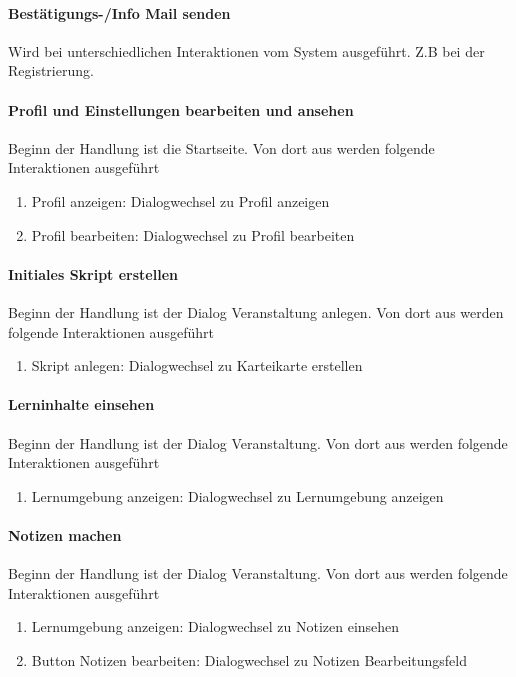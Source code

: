 \documentclass[12pt,a4paper]{article}
\begin{document}
{\paragraph{Bestätigungs-/Info Mail senden}
Wird bei unterschiedlichen Interaktionen vom System ausgeführt. Z.B bei der Registrierung.

\paragraph{Profil und Einstellungen bearbeiten und ansehen}
Beginn der Handlung ist die Startseite. Von dort aus werden folgende Interaktionen ausgeführt
\begin{enumerate}
\item \glqq Profil anzeigen\grqq: Dialogwechsel zu \glqq Profil anzeigen\grqq
\item \glqq Profil bearbeiten\grqq: Dialogwechsel zu \glqq Profil bearbeiten\grqq
\end{enumerate}
\paragraph{Initiales Skript erstellen}
Beginn der Handlung ist der Dialog \glqq Veranstaltung anlegen\grqq. Von dort aus werden folgende Interaktionen ausgeführt
\begin{enumerate}
\item \glqq Skript anlegen\grqq: Dialogwechsel zu \glqq Karteikarte erstellen\grqq
\end{enumerate}

\paragraph{Lerninhalte einsehen}
Beginn der Handlung ist der Dialog \glqq Veranstaltung\grqq. Von dort aus werden folgende Interaktionen ausgeführt
\begin{enumerate}
\item \glqq Lernumgebung anzeigen\grqq: Dialogwechsel zu \glqq Lernumgebung anzeigen\grqq
\end{enumerate}

\paragraph{Notizen machen}
Beginn der Handlung ist der Dialog \glqq Veranstaltung\grqq. Von dort aus werden folgende Interaktionen ausgeführt
\begin{enumerate}
\item \glqq Lernumgebung anzeigen\grqq: Dialogwechsel zu \glqq Notizen einsehen\grqq
\item \glqq Button Notizen bearbeiten\grqq: Dialogwechsel zu \glqq Notizen Bearbeitungsfeld\grqq
\end{enumerate}

}
\end{document}
